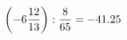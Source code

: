 \documentclass[preview]{standalone}
\begin{document}
\begin{align*}
\left( -6 { 12 \over 13 } \right)  :  { 8 \over 65 } = -41.25
\end{align*}
\end{document}
